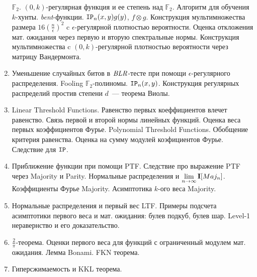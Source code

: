 \begin{enumerate}
        $\mathbb{F}_2$. $(0, k)$-регулярная функция и ее степень над $\mathbb{F}_2$. Алгоритм для обучения
        $k$-хунты. \textit{bent}-функции. $\mathtt{IP}_n(x, y) g(y)$, $f \otimes g$. Конструкция мультимножества размера $16
        (\frac{n}{\epsilon})^2$ c $\epsilon$-регулярной плотностью вероятности. Оценка откложения мат. ожидания через первую
        и вторую спектральные нормы. Конструкция мультимножества c $(0, k)$-регулярной плотностью вероятности через матрицу
        Вандермонта.
    \item Уменьшение случайных битов в $\mathit{BLR}$-тесте при помощи $\epsilon$-регулярного распределения. Fooling
        $\mathbb{F}_2$-полиномы. $\mathtt{IP}_n(x, y)$. Конструкция регулярных распределий простив степени $d$~--- теорема Виолы.
    \item Linear Threshold Functions. Равенство первых коеффициентов влечет равенство. Связь первой и второй нормы линейных
        функций. Оценка веса первых коэффициентов Фурье. Polynomial Threshold Functions. Обобщение критерия равенства. Оценка
        на сумму модулей коэфициентов Фурье. Следствие для $\mathtt{IP}$.
    \item Приближение функции при помощи PTF. Следствие про выражение PTF через Majority и Parity. Нормальные распределения и
        $\lim\limits_{n \to \infty} \mathbf{I}[Maj_n]$. Коэффициенты Фурье Majority. Асимптотика $k$-ого веса Majority.
    \item Нормальные распределения и первый вес LTF. Примеры подсчета асимптотики первого веса и мат. ожидания: булев подкуб,
        булев шар. Level-1 неравернство и его доказательство.
    \item $\frac{2}{\pi}$-теорема. Оценки первого веса для функций с ограниченный модулем мат. ожидания. Лемма Bonami. FKN теорема.
    \item Гиперсжимаемость и KKL теорема.
\end{enumerate}
